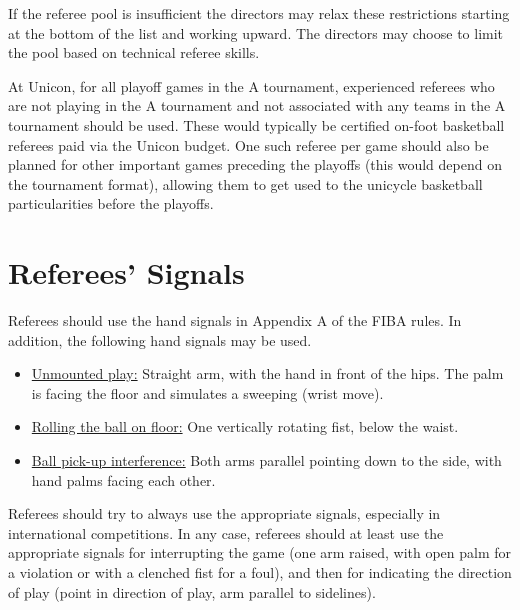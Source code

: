 If the referee pool is insufficient the directors may relax these restrictions starting at the bottom 
of the list and working upward. The directors may choose to limit the pool based on technical referee skills.

At Unicon, for all playoff games in the A tournament, experienced referees who are not playing in the A tournament 
and not associated with any teams in the A tournament should be used. These would typically be certified on-foot basketball 
referees paid via the Unicon budget. One such referee per game should also be planned for other important games preceding 
the playoffs (this would depend on the tournament format), allowing them to get used to the unicycle basketball particularities before the playoffs.

\newpage
\section{Referees' Signals}
Referees should use the hand signals in Appendix A of the FIBA rules. In addition, the following hand signals may be used.

\begin{itemize}
  \item {\underline{Unmounted play:}} Straight arm, with the hand in front of the hips. The palm is facing the floor and simulates a sweeping (wrist move).
  \item {\underline{Rolling the ball on floor:}} One vertically rotating fist, below the waist.
  \item {\underline{Ball pick-up interference:}} Both arms parallel pointing down to the side, with hand palms facing each other.
\end{itemize}

Referees should try to always use the appropriate signals, especially in international competitions. 
In any case, referees should at least use the appropriate signals for interrupting the game 
(one arm raised, with open palm for a violation or with a clenched fist for a foul), and then for indicating the direction
of play (point in direction of play, arm parallel to sidelines).